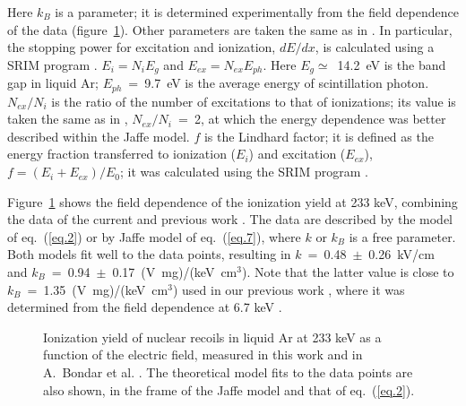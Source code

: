 \documentclass[a4paper,11pt]{article}
\begin{document}
Here $k_B$ is a parameter; it is determined experimentally from the field dependence of the data (figure~\ref{IonYieldVsE}). Other parameters are taken the same as in \cite{IonYield14}. In particular, the stopping power for excitation and ionization, $dE/dx$, is calculated using a SRIM program \cite{SRIM}. $E_i=N_i E_g$ and $E_{ex}=N_{ex}E_{ph}$. Here $E_g\simeq$~14.2~eV is the band gap in liquid Ar; $E_{ph}$~=~9.7~eV is the average energy of scintillation photon. $N_{ex}/N_i$ is the ratio of the number of excitations to that of ionizations; its value is taken the same as in \cite{IonYield14}, $N_{ex}/N_i$~=~2, at which the energy dependence was better described within the Jaffe model. $f$ is the Lindhard factor; it is defined as the energy fraction transferred to ionization ($E_i$) and excitation ($E_{ex}$), $f=(E_i+E_{ex})/E_0$; it was calculated using the SRIM program \cite{SRIM}.

Figure~\ref{IonYieldVsE} shows the field dependence of the ionization yield at 233 keV, combining the data of the current and previous work \cite{IonYield14}. The data are described by the model of eq.~(\ref{eq.2}) or by Jaffe model of eq.~(\ref{eq.7}), where $k$ or $k_B$ is a free parameter. Both models fit well to the data points, resulting in $k$~=~0.48~$\pm$~0.26~kV/cm and  $k_B$~=~0.94~$\pm$~0.17~(V~mg)/(keV~cm$^3$). Note that the latter value is close to $k_B$~=~1.35~(V~mg)/(keV~cm$^3$) used in our previous work \cite{IonYield14}, where it was determined from the field dependence at 6.7 keV \cite{Joshi}.
\begin{figure}[ht!]
	\caption{Ionization yield of nuclear recoils in liquid Ar at 233
		keV as a function of the electric field, measured in this work and in A.~Bondar et al. \cite{IonYield14}. The theoretical model fits to the data points are also shown, in the frame of the Jaffe model and that of eq.~(\ref{eq.2}).}
	\label{IonYieldVsE}
\end{figure}
\end{document}

